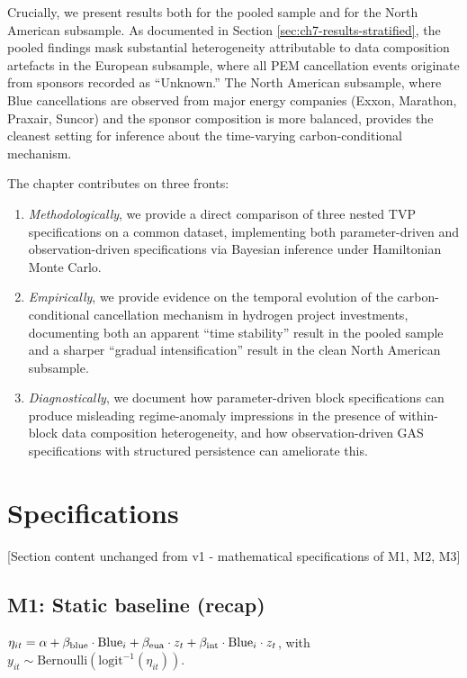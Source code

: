 Crucially, we present results both for the pooled sample and for the North American subsample. As documented in Section \ref{sec:ch7-results-stratified}, the pooled findings mask substantial heterogeneity attributable to data composition artefacts in the European subsample, where all PEM cancellation events originate from sponsors recorded as ``Unknown.'' The North American subsample, where Blue cancellations are observed from major energy companies (Exxon, Marathon, Praxair, Suncor) and the sponsor composition is more balanced, provides the cleanest setting for inference about the time-varying carbon-conditional mechanism.

The chapter contributes on three fronts:
\begin{enumerate}
    \item \textit{Methodologically}, we provide a direct comparison of three nested TVP specifications on a common dataset, implementing both parameter-driven and observation-driven specifications via Bayesian inference under Hamiltonian Monte Carlo.
    \item \textit{Empirically}, we provide evidence on the temporal evolution of the carbon-conditional cancellation mechanism in hydrogen project investments, documenting both an apparent ``time stability'' result in the pooled sample and a sharper ``gradual intensification'' result in the clean North American subsample.
    \item \textit{Diagnostically}, we document how parameter-driven block specifications can produce misleading regime-anomaly impressions in the presence of within-block data composition heterogeneity, and how observation-driven GAS specifications with structured persistence can ameliorate this.
\end{enumerate}

\section{Specifications}
\label{sec:ch7-specifications}
\label{sec:ch7-spec}

[Section content unchanged from v1 - mathematical specifications of M1, M2, M3]

\subsection*{M1: Static baseline (recap)}
$\eta_{it} = \alpha + \beta_{\mathrm{blue}} \cdot \mathrm{Blue}_i + \beta_{\mathrm{eua}} \cdot z_t + \beta_{\mathrm{int}} \cdot \mathrm{Blue}_i \cdot z_t$,
with $y_{it} \sim \mathrm{Bernoulli}(\mathrm{logit}^{-1}(\eta_{it}))$.

